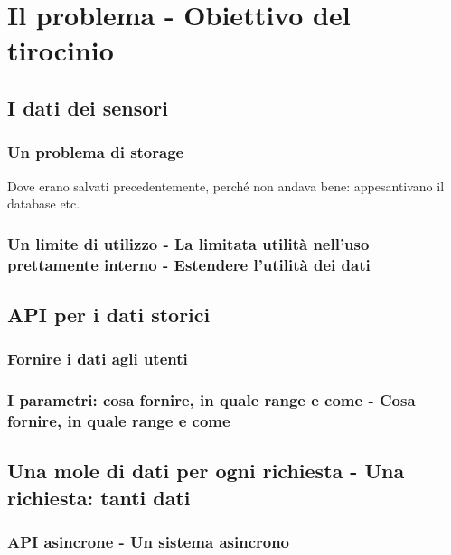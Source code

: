 \chapter{Il problema - Obiettivo del tirocinio}

\section{I dati dei sensori}

\subsection{Un problema di storage}

Dove erano salvati precedentemente, perché non andava bene: appesantivano il database etc.

\subsection{Un limite di utilizzo - La limitata utilità nell'uso prettamente interno - Estendere l'utilità dei dati}


\section{API per i dati storici}

\subsection{Fornire i dati agli utenti}

\subsection{I parametri: cosa fornire, in quale range e come - Cosa fornire, in quale range e come} \label{parametri}


\section{Una mole di dati per ogni richiesta - Una richiesta: tanti dati}

\subsection{API asincrone - Un sistema asincrono}


